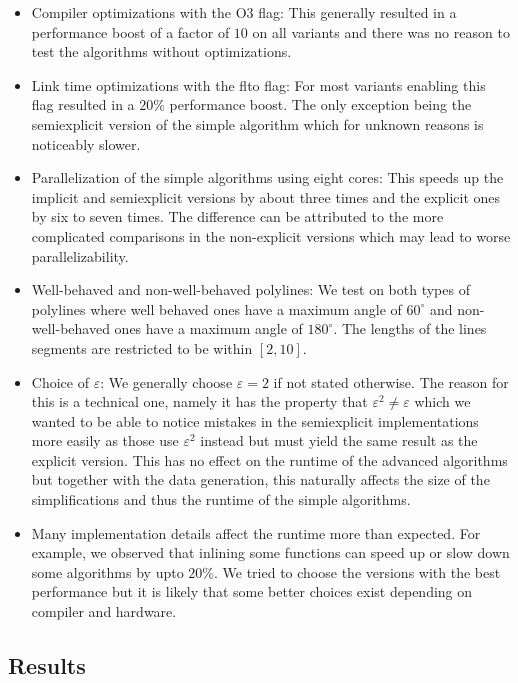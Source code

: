 \begin{itemize}
  \item Compiler optimizations with the O3 flag: This generally resulted in a performance boost of a factor of \(10\) on all variants and there was no reason to test the algorithms without optimizations.
	\item Link time optimizations with the flto flag: For most variants enabling this flag resulted in a \(20\%\) performance boost. The only exception being the semiexplicit version of the simple algorithm which for unknown reasons is noticeably slower.
	\item Parallelization of the simple algorithms using eight cores: This speeds up the implicit and semiexplicit versions by about three times and the explicit ones by six to seven times. The difference can be attributed to the more complicated comparisons in the non-explicit versions which may lead to worse parallelizability. 
	\item Well-behaved and non-well-behaved polylines: We test on both types of polylines where well behaved ones have a maximum angle of \(60^\circ\) and non-well-behaved ones have a maximum angle of \(180^\circ\). The lengths of the lines segments are restricted to be within \([2, 10]\). 
	\item Choice of \(\varepsilon\): We generally choose \(\varepsilon = 2\) if not stated otherwise. The reason for this is a technical one, namely it has the property that \(\varepsilon^2 \neq \varepsilon\) which we wanted to be able to notice mistakes in the semiexplicit implementations more easily as those use \(\varepsilon^2\) instead but must yield the same result as the explicit version. This has no effect on the runtime of the advanced algorithms but together with the data generation, this naturally affects the size of the simplifications and thus the runtime of the simple algorithms.
	\item Many implementation details affect the runtime more than expected. For example, we observed that inlining some functions can speed up or slow down some algorithms by upto \(20\%\). We tried to choose the versions with the best performance but it is likely that some better choices exist depending on compiler and hardware. 
\end{itemize}

\subsection{Results}
\label{subsec:results}

